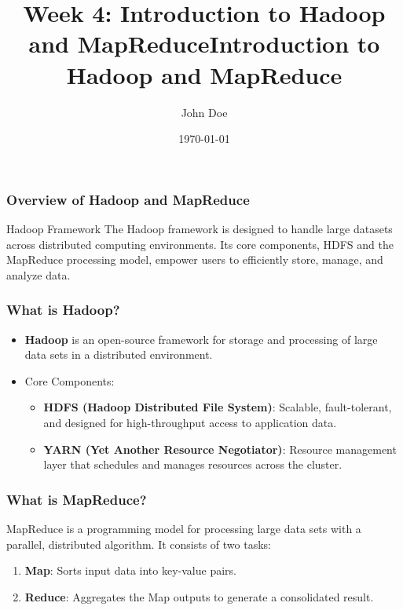 \documentclass[aspectratio=169]{beamer}
\title[Hadoop and MapReduce]{Week 4: Introduction to Hadoop and MapReduce}
\author[John Doe]{John Doe}
\institute[University Name]{
  Department of Computer Science\\
  University Name\\
  \vspace{0.3cm}
  Email: email@university.edu\\
  Website: www.university.edu
}
\date{\today}
\begin{document}
\frame{\titlepage}

\begin{frame}
    \title{Introduction to Hadoop and MapReduce}
    \maketitle
\end{frame}

\begin{frame}
    \frametitle{Overview of Hadoop and MapReduce}
    \begin{block}{Hadoop Framework}
        The Hadoop framework is designed to handle large datasets across distributed computing environments. Its core components, HDFS and the MapReduce processing model, empower users to efficiently store, manage, and analyze data.
    \end{block}
\end{frame}

\begin{frame}
    \frametitle{What is Hadoop?}
    \begin{itemize}
        \item \textbf{Hadoop} is an open-source framework for storage and processing of large data sets in a distributed environment.
        \item Core Components:
            \begin{itemize}
                \item \textbf{HDFS (Hadoop Distributed File System)}: Scalable, fault-tolerant, and designed for high-throughput access to application data.
                \item \textbf{YARN (Yet Another Resource Negotiator)}: Resource management layer that schedules and manages resources across the cluster.
            \end{itemize}
    \end{itemize}
\end{frame}

\begin{frame}
    \frametitle{What is MapReduce?}
    MapReduce is a programming model for processing large data sets with a parallel, distributed algorithm. It consists of two tasks:
    \begin{enumerate}
        \item \textbf{Map}: Sorts input data into key-value pairs.
        \item \textbf{Reduce}: Aggregates the Map outputs to generate a consolidated result.
    \end{enumerate}
\end{frame}
\end{document}

